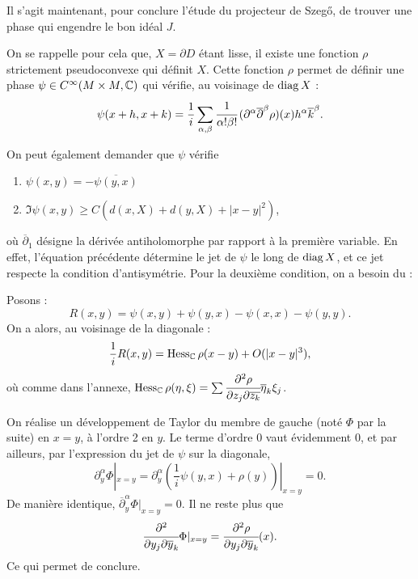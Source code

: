 Il s'agit maintenant, pour conclure l'étude du projecteur de Szeg\H{o}, de trouver une phase qui engendre le bon idéal $J$.

On se rappelle pour cela que, $X=\partial D$ étant lisse, il existe une fonction $\rho$ strictement pseudoconvexe qui définit $X$. Cette fonction $\rho$ permet de définir une phase $\psi \in C^{\infty}(M \times M,\mathbb{C})$ qui vérifie, au voisinage de $\operatorname{diag} X$ :
\begin{equation*}
	\psi(x+h,x+k) = \frac1i \sum_{\alpha,\beta}\cfrac{1}{\alpha !\beta!}\,(\partial^{\alpha}\overline{\partial}^{\beta}\rho)(x)h^{\alpha}\overline{k}^{\beta}.
\end{equation*}

On peut également demander que $\psi$ vérifie 
\begin{enumerate}
	\item $\psi(x,y)=-\overline{\psi(y,x)}$
	\item $\Im \psi(x,y) \geq C(d(x,X)+d(y,X) + |x-y|^2)$,
\end{enumerate}
où $\overline{\partial}_1$ désigne la dérivée antiholomorphe par rapport à la première variable. En effet, l'équation précédente détermine le jet de $\psi$ le long de $\operatorname{diag} X$, et ce jet respecte la condition d'antisymétrie. Pour la deuxième condition, on a besoin du :
\begin{lem} Posons :
	\begin{equation*}
		R(x,y)=\psi(x,y) + \psi(y,x)-\psi(x,x)-\psi(y,y).
	\end{equation*}
	On a alors, au voisinage de la diagonale :
	\begin{equation*}
	\frac{1}{i}R(x,y)= \operatorname{Hess}_{\mathbb{C}}\rho(x-y) + O(|x-y|^3),
	\end{equation*}
	où comme dans l'annexe, $\operatorname{Hess}_{\mathbb{C}}\rho(\eta,\xi)=\sum \cfrac{\partial^2\rho}{\partial z_j \partial \overline{z_k}}\overline{\eta}_k\xi_j$.
\end{lem}
\begin{preuve}
	On réalise un développement de Taylor du membre de gauche (noté $\Phi$ par la suite) en $x=y$, à l'ordre 2 en $y$. Le terme d'ordre 0 vaut évidemment $0$, et par ailleurs, par l'expression du jet de $\psi$ sur la diagonale,
	\begin{equation*}
		\partial^{\alpha}_y\Phi|_{x=y} = \partial^{\alpha}_y(\frac{1}{i}\psi(y,x) + \rho(y))|_{x=y}=0.
	\end{equation*}
	De manière identique, $\overline{\partial}^{\alpha}_y\Phi|_{x=y}=0$. Il ne reste plus que
	\begin{equation*}
		\cfrac{\partial^2 }{\partial y_j\partial \overline{y}_k}\Phi|_{x=y} = \cfrac{\partial^2 \rho}{\partial y_j\partial \overline{y}_k}(x).
	\end{equation*}
	Ce qui permet de conclure.
\end{preuve}
